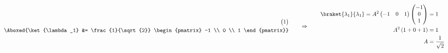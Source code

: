\documentclass{article}
\begin{document}
\begin{enumerate}
\begin{equation*}
\begin{split}
\begin{pmatrix}
					1
				\end{pmatrix} \\
				\Aboxed{\ket{\lambda_1} &= \frac{1}{\sqrt{2}} \begin{pmatrix}
						-1 \\
						0 \\
						1
				\end{pmatrix}}
			\end{split}
			\qquad \Rightarrow \qquad
			\begin{split}
				\braket{\lambda_1}{\lambda_1} = A^2 \begin{pmatrix}
					-1 & 0 & 1
				\end{pmatrix}
				\begin{pmatrix}
					-1 \\
					0 \\
					1
				\end{pmatrix} &= 1 \\
				A^2 \left( 1 + 0 + 1 \right) &= 1 \\
				A &= \frac{1}{\sqrt{2}}
			\end{split}
		\end{equation*}
		
\clearpage
		

\end{enumerate}
\end{document}
